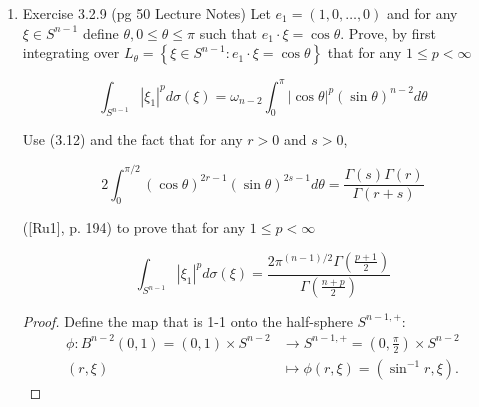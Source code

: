 \begin{enumerate}
\begin{proof}
	Recall several facts from measure theory:
	\begin{enumerate}
		\item For Borel measurable spaces $(A, \mathcal{B}_A)$ and $(B, \mathcal{B}_B)$, $\mathcal{B}_A \times \mathcal{B}_B$ generates $\mathcal{B}(A \times B)$ the product $\sigma$-algebra.
		\item If two measures $\mu, \nu$ agree (as pre-measures) on a set algebra $\mathcal{A}$, then they agree on $\sigma(\mathcal{A})$.
	\end{enumerate}

	Now, for $E \in \mathcal{B}(S)$, let $\mathcal{A}_E$ be the collections of sets that are finite disjoint unions of sets of the form $(a,b] \times E$. Then $\mathcal{A}_E$ is a set algebra that generates the $\sigma$-algebra $\mathcal{M}_E = \{A \times E: A \in \mathcal{B}((0,\infty ))\} $. Now, $\mathcal{M} = \cup _{E \in B(S^{n - 1})}\mathcal{M}_E = \mathcal{B}(0,\infty ) \times \mathcal{B}S^{n - 1}$ is the collection of all Borel cubes, which generate the product Borel $\sigma$-algebra on $(0,\infty ) \times S^{n - 1}$.

	We have $\phi_* m = \rho \times \sigma$ on $\mathcal{A}_E$ by linearity, so they also agree on $\mathcal{M}_E$ for each $E$. Hence they agree on $ \mathcal{M}$, thus agree on $\mathcal{B}\left( (0,\infty ) \times S^{n - 1} \right) $.
	
\end{proof}




	\item Exercise 3.2.9 (pg 50 Lecture Notes) 
Let $e_1=(1,0, \ldots, 0)$ and for any $\xi \in S^{n-1}$ define $\theta, 0 \leq \theta \leq \pi$ such that $e_1 \cdot \xi=\cos \theta$. Prove, by first integrating over $L_\theta=\left\{\xi \in S^{n-1}: e_1 \cdot \xi=\cos \theta\right\}$ that for any $1 \leq p<\infty$

\[
\int_{S^{n-1}}\left|\xi_1\right|^p d \sigma(\xi)=\omega_{n-2} \int_0^\pi|\cos \theta|^p(\sin \theta)^{n-2} d \theta
\]


Use (3.12) and the fact that for any $r>0$ and $s>0$,

\[
2 \int_0^{\pi / 2}(\cos \theta)^{2 r-1}(\sin \theta)^{2 s-1} d \theta=\frac{\Gamma(s) \Gamma(r)}{\Gamma(r+s)}
\]

([Ru1], p. 194) to prove that for any $1 \leq p<\infty$

\[
\int_{S^{n-1}}\left|\xi_1\right|^p d \sigma(\xi)=\frac{2 \pi^{(n-1) / 2} \Gamma\left(\frac{p+1}{2}\right)}{\Gamma\left(\frac{n+p}{2}\right)}
\]
\begin{proof}
	Define the map that is 1-1 onto the half-sphere $S^{n - 1, +}$:
	\begin{align*}
		\phi: B^{n - 2}(0,1) = (0,1) \times  S^{n - 2} &\longrightarrow S^{n-1, +} = (0,\frac{\pi}{2}) \times S^{n - 2} \\
		(r, \xi)&\longmapsto \phi(r, \xi) = (\sin^{-1 } r, \xi)
	.\end{align*}


\end{proof}
\end{enumerate}

